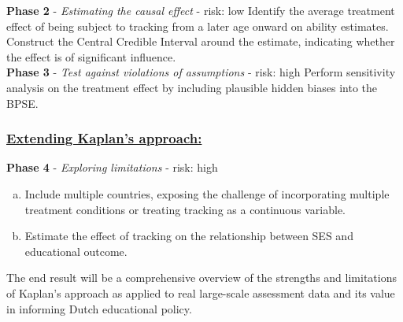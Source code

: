 \documentclass{article}
\begin{document}
\textbf{Phase 2} - \textit{Estimating the causal effect} - risk: low \newline
Identify the average treatment effect of being subject to tracking from a later age onward on ability estimates. Construct the Central Credible Interval around the estimate, indicating whether the effect is of significant influence.\\

\textbf{Phase 3} - \textit{Test against violations of assumptions} - risk: high \newline
Perform sensitivity analysis on the treatment effect by including plausible hidden biases into the BPSE.

\subsubsection*{\underline{Extending Kaplan's approach:}} 
\hspace{\parindent} \textbf{Phase 4} - \textit{Exploring limitations} - risk: high
\begin{enumerate}[a)]
    \item Include multiple countries, exposing the challenge of incorporating multiple treatment conditions or treating tracking as a continuous variable.
    \item Estimate the effect of tracking on the relationship between SES and educational outcome. 
\end{enumerate}

\noindent The end result will be a comprehensive overview of the strengths and limitations of Kaplan's approach as applied to real large-scale assessment data and its value in informing Dutch educational policy.  

\newpage
\printbibliography
\nocite{*}
\end{document}
